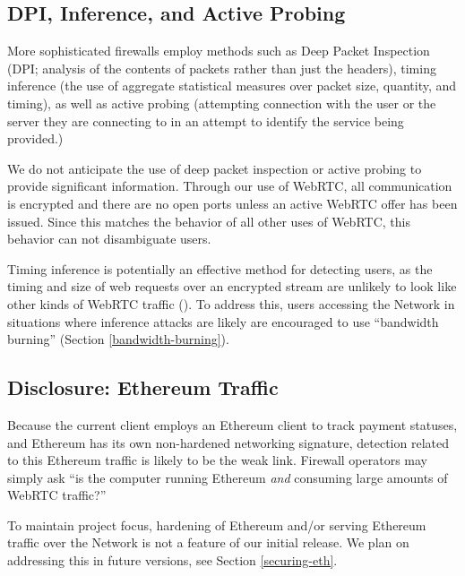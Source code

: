 \subsection{DPI, Inference, and Active Probing}

More sophisticated firewalls employ methods such as Deep Packet
Inspection (DPI; analysis of the contents of packets rather than just
the headers), timing inference (the use of aggregate statistical
measures over packet size, quantity, and timing), as well as active
probing (attempting connection with the user or the server they are
connecting to in an attempt to identify the service being provided.)

We do not anticipate the use of deep packet inspection or active
probing to provide significant information. Through our use of WebRTC,
all communication is encrypted and there are no open ports unless an
active WebRTC offer has been issued. Since this matches the behavior
of all other uses of WebRTC, this behavior can not disambiguate \Orchid{}
users.

Timing inference is potentially an effective method for detecting
\Orchid{} users, as the timing and size of web requests over an encrypted
stream are unlikely to look like other kinds of WebRTC traffic
(\cite{peekaboo}). To address this, users accessing the \Orchid{} Network
in situations where inference attacks are likely are encouraged to use
``bandwidth burning'' (Section \ref{bandwidth-burning}).

\subsection{Disclosure: Ethereum Traffic}

Because the current client employs an Ethereum client to track payment
statuses, and Ethereum has its own non-hardened networking signature,
detection related to this Ethereum traffic is likely to be the weak
link. Firewall operators may simply ask ``is the computer running
Ethereum \emph{and} consuming large amounts of WebRTC traffic?''

To maintain project focus, hardening of Ethereum and/or serving
Ethereum traffic over the \Orchid{} Network is not a feature of our
initial release. We plan on addressing this in future versions, see
Section \ref{securing-eth}.

